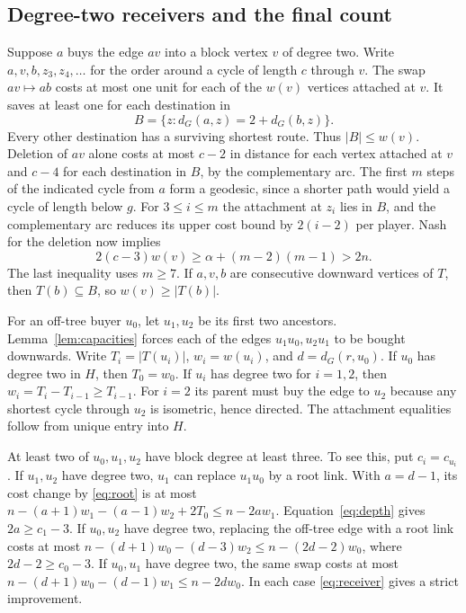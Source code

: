 \documentclass[11pt]{article}
\newcommand{\dG}{d_G}
\newcommand{\abs}[1]{\left|#1\right|}
\begin{document}
\subsection{Degree-two receivers and the final count}

Suppose \(a\) buys the edge \(av\) into a block vertex \(v\) of
degree two. Write \(a,v,b,z_3,z_4,\ldots\) for the order around
a cycle of length \(c\) through \(v\). The swap \(av\mapsto ab\)
costs at most one unit for each of the \(w(v)\) vertices attached
at \(v\). It saves at least one for each destination in
\[
 B=\{z:\dG(a,z)=2+\dG(b,z)\}.
\]
Every other destination has a surviving shortest route. Thus
\(\abs{B}\le w(v)\). Deletion of \(av\) alone costs at most
\(c-2\) in distance for each vertex attached at \(v\) and
\(c-4\) for each destination in \(B\), by the complementary arc.
The first \(m\) steps of the indicated cycle from \(a\) form a
geodesic, since a shorter path would yield a cycle of length below
\(g\). For \(3\le i\le m\) the attachment at \(z_i\) lies in \(B\),
and the complementary arc reduces its upper cost bound by
\(2(i-2)\) per player. Nash for the deletion now implies
\[
 2(c-3)w(v)\ge \alpha+(m-2)(m-1)>2n.
 \tag{7}\label{eq:receiver}
\]
The last inequality uses \(m\ge7\). If \(a,v,b\) are consecutive
downward vertices of \(T\), then \(T(b)\subseteq B\), so
\(w(v)\ge\abs{T(b)}\).

For an off-tree buyer \(u_0\), let \(u_1,u_2\) be its first two
ancestors. Lemma~\ref{lem:capacities} forces each of the edges
\(u_1u_0,u_2u_1\) to be bought downwards. Write
\(T_i=\abs{T(u_i)}\), \(w_i=w(u_i)\), and \(d=\dG(r,u_0)\).
If \(u_0\) has degree two in \(H\), then \(T_0=w_0\).
If \(u_i\) has degree two for \(i=1,2\), then
\(w_i=T_i-T_{i-1}\ge T_{i-1}\).
For \(i=2\) its parent must buy the edge to \(u_2\) because any
shortest cycle through \(u_2\) is isometric, hence directed.
The attachment equalities follow from unique entry into \(H\).

At least two of \(u_0,u_1,u_2\) have block degree at least three.
To see this, put \(c_i=c_{u_i}\). If \(u_1,u_2\) have degree
two, \(u_1\) can replace \(u_1u_0\) by a root link.
With \(a=d-1\), its cost change by \eqref{eq:root} is at most
\(n-(a+1)w_1-(a-1)w_2+2T_0\le n-2a w_1\).
Equation~\eqref{eq:depth} gives \(2a\ge c_1-3\).
If \(u_0,u_2\) have degree two, replacing the off-tree edge
with a root link costs at most
\(n-(d+1)w_0-(d-3)w_2\le n-(2d-2)w_0\), where
\(2d-2\ge c_0-3\). If \(u_0,u_1\) have degree two, the
same swap costs at most \(n-(d+1)w_0-(d-1)w_1\le n-2d w_0\).
In each case \eqref{eq:receiver} gives a strict improvement.
\end{document}
